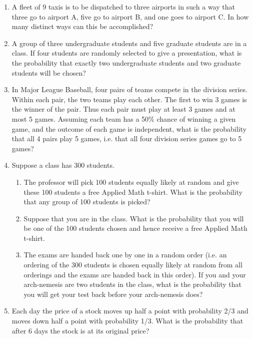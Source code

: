 \documentclass[12pt]{article}
\begin{document}
\begin{enumerate}
\item A fleet of 9 taxis is to be dispatched to three airports in such a way that three go to airport A, five go to airport B, and one goes to airport C. In how many distinct ways can this be accomplished?

\item A group of three undergraduate students and five graduate students are in a class. If four students are randomly selected to give a presentation, what is the probability that exactly two undergraduate students and two graduate students will be chosen?

\item In Major League Baseball, four pairs of teams compete in the division series. Within each pair, the two teams play each other. The first to win 3 games is the winner of the pair. Thus each pair must play at least 3 games and at most 5 games. Assuming each team has a 50\% chance of winning a given game, and the outcome of each game is independent, what is the probability that all 4 pairs play 5 games, i.e. that all four division series games go to 5 games?

\item Suppose a class has 300 students.\\
\begin{enumerate}
\item The professor will pick 100 students equally likely at random and give these 100 students a free Applied Math t-shirt. What is the probability that any group of 100 students is picked?\\
\item Suppose that you are in the class. What is the probability that you will be one of the 100 students chosen and hence receive a free Applied Math t-shirt.\\
\item The exams are handed back one by one in a random order (i.e. an ordering of the 300 students is chosen equally likely at random from all orderings and the exams are handed back in this order). If you and your arch-nemesis are two students in the class, what is the probability that you will get your test back before your arch-nemesis does?
\end{enumerate}

\item Each day the price of a stock moves up half a point with probability 2/3 and moves down half a point with probability 1/3. What is the probability that after 6 days the stock is at its original price?


\end{enumerate}
\end{document}
